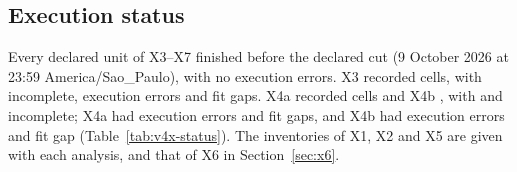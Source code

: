 \subsection{Execution status}\label{sec:x-status}

Every declared unit of X3--X7 finished before the declared cut (9 October 2026 at 23:59 America/Sao\_Paulo), with no execution errors. X3 recorded  cells, with  incomplete,  execution errors and  fit gaps. X4a recorded  cells and X4b , with  and  incomplete; X4a had  execution errors and  fit gaps, and X4b had  execution errors and  fit gap (Table~\ref{tab:v4x-status}). The inventories of X1, X2 and X5 are given with each analysis, and that of X6 in Section~\ref{sec:x6}.





